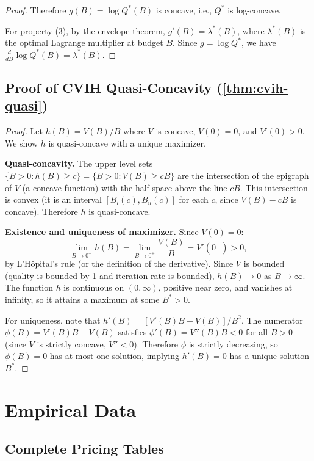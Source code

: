 \documentclass[11pt, a4paper, logo, copyright]{googledeepmind}
\begin{document}
\begin{appendices}
\begin{proof}
Therefore $g(B) = \log Q^*(B)$ is concave, i.e., $Q^*$ is log-concave.

For property (3), by the envelope theorem, $g'(B) = \lambda^*(B)$, where $\lambda^*(B)$ is the optimal Lagrange multiplier at budget $B$. Since $g = \log Q^*$, we have $\frac{d}{dB}\log Q^*(B) = \lambda^*(B)$.
\end{proof}

\subsection{Proof of CVIH Quasi-Concavity (\texorpdfstring{\cref{thm:cvih-quasi}}{Theorem 7.2})}

\begin{proof}
Let $h(B) = V(B)/B$ where $V$ is concave, $V(0) = 0$, and $V'(0) > 0$. We show $h$ is quasi-concave with a unique maximizer.

\textbf{Quasi-concavity.} The upper level sets $\{B > 0 : h(B) \geq c\} = \{B > 0 : V(B) \geq cB\}$ are the intersection of the epigraph of $V$ (a concave function) with the half-space above the line $cB$. This intersection is convex (it is an interval $[B_l(c), B_u(c)]$ for each $c$, since $V(B) - cB$ is concave). Therefore $h$ is quasi-concave.

\textbf{Existence and uniqueness of maximizer.} Since $V(0) = 0$:
\[
    \lim_{B \to 0^+} h(B) = \lim_{B \to 0^+} \frac{V(B)}{B} = V'(0^+) > 0,
\]
by L'H\^{o}pital's rule (or the definition of the derivative). Since $V$ is bounded (quality is bounded by 1 and iteration rate is bounded), $h(B) \to 0$ as $B \to \infty$. The function $h$ is continuous on $(0,\infty)$, positive near zero, and vanishes at infinity, so it attains a maximum at some $B^* > 0$.

For uniqueness, note that $h'(B) = [V'(B)B - V(B)]/B^2$. The numerator $\phi(B) = V'(B)B - V(B)$ satisfies $\phi'(B) = V''(B)B < 0$ for all $B > 0$ (since $V$ is strictly concave, $V'' < 0$). Therefore $\phi$ is strictly decreasing, so $\phi(B) = 0$ has at most one solution, implying $h'(B) = 0$ has a unique solution $B^*$.
\end{proof}


\section{Empirical Data}\label{app:empirical}

\subsection{Complete Pricing Tables}


\end{appendices}
\end{document}
